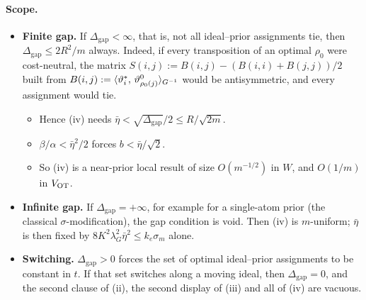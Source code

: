 \paragraph{Scope.}
\begin{itemize}
  \item \textbf{Finite gap.} If $\Delta_{\mathrm{gap}}<\infty$, that is, not all ideal--prior assignments tie, then
    $\Delta_{\mathrm{gap}}\le 2R^2/m$ always. Indeed, if every transposition of an optimal $\rho_0$ were
    cost-neutral, the matrix $S(i,j) := B(i,j) - (B(i,i)+B(j,j))/2$ built from
    $B(i,j) := \langle \vartheta^*_i,\, \vartheta^0_{\rho_0(j)}\rangle_{G^{-1}}$ would be antisymmetric, and every assignment
    would tie.
    \begin{itemize}
      \item Hence (iv) needs $\bar\eta < \sqrt{\Delta_{\mathrm{gap}}}/2 \le R/\sqrt{2m}$.
      \item $\beta/\alpha < \bar\eta^2/2$ forces $b < \bar\eta/\sqrt2$.
      \item So (iv) is a near-prior local result of size $O(m^{-1/2})$ in $W$, and $O(1/m)$ in $V_{\mathrm{OT}}$.
    \end{itemize}
  \item \textbf{Infinite gap.} If $\Delta_{\mathrm{gap}} = +\infty$, for example for a single-atom prior (the
    classical $\sigma$-modification), the gap condition is void. Then (iv) is $m$-uniform; $\bar\eta$ is then fixed
    by $8K^2\lambda_G^2\bar\eta^2\le k_e\sigma_m$ alone.
  \item \textbf{Switching.} $\Delta_{\mathrm{gap}}>0$ forces the set of optimal ideal--prior assignments to be
    constant in $t$. If that set switches along a moving ideal, then $\Delta_{\mathrm{gap}} = 0$, and the second
    clause of (ii), the second display of (iii) and all of (iv) are vacuous.
\end{itemize}

